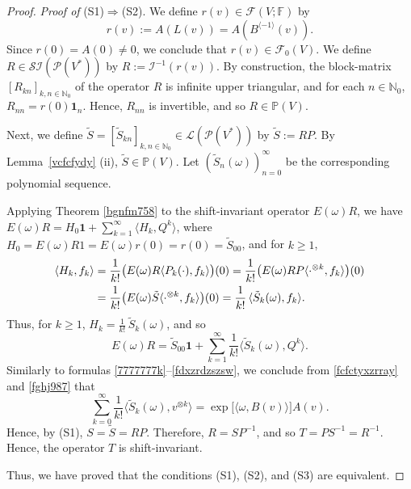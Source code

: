\documentclass[12pt]{article}
\theoremstyle{remark}
\theoremstyle{remark}
\theoremstyle{remark}
\begin{document}
\begin{proof}
{\it Proof of \/} (S1)$\Rightarrow$(S2). We define $r(v)\in \mathcal F(V;\mathbb F)$ by 
\begin{equation}\label{fcfctyxzrray}
r(v):=A(L(v))=A(B^{\langle -1\rangle}(v)).\end{equation}
  Since $r(0)=A(0)\ne0$, we conclude that $r(v)\in\mathcal F_0(V)$. We define $R\in \mathcal{SI}(\mathcal P(V^*))$ by $R:=\mathcal I^{-1}(r(v))$. By construction, the block-matrix $[R_{kn}]_{k,n\in\mathbb N_0}$ of the operator $R$ is infinite upper triangular, and for each $n\in\mathbb N_0$, $R_{nn}=r(0)\mathbf 1_n$. Hence, $R_{nn}$ is invertible, and so $R\in\mathbb P(V)$. 


Next, we define $\tilde {S}=[\tilde {S}_{kn}] _{k,n\in\mathbb N_0}\in \mathcal L (\mathcal P(V^*))$ by $\tilde{S} := RP$. By Lemma~\ref{vcfcfydy} (ii), $\tilde S\in\mathbb P(V)$.
 Let $(\tilde S_n(\omega))_{n=0}^\infty$ be the corresponding polynomial sequence. 

 Applying Theorem \ref{bgnfm758} to the shift-invariant operator $E(\omega)R$, we have 
$E(\omega)R=H_0\mathbf 1+\sum_{k=1}^\infty \langle H_k, Q^{k}\rangle$,
where $H_0=E(\omega)R1=E(\omega)r(0)=r(0)=\tilde S_{00}$, and for $k\geq 1$,
\begin{align*}
\langle H_k,f_k\rangle&=\frac1{k!}\big(E(\omega)R\langle P_k(\cdot),f_k\rangle\big)(0)=\frac1{k!}\big(E(\omega)RP\langle\cdot^{\otimes k},f_k\rangle\big)(0)\\
& =\frac1{k!}\big(E(\omega)\tilde S\langle\cdot^{\otimes k},f_k\rangle\big)(0)=\frac1{k!}\,\langle\Tilde S_k(\omega),f_k\rangle.
\end{align*}
Thus, for $k\geq 1$, $H_k=\frac 1{k!}\,\tilde S_k(\omega)$, and so 
\begin{equation}E(\omega)R=\tilde S_{00}\mathbf 1+\sum_{k=1}^\infty \frac 1{k!}\langle \tilde S_k(\omega),
Q^{k}\rangle.\label{fghj987}\end{equation} 
Similarly to formulas \eqref{7777777k}--\eqref{fdxzrdzszsw}, we conclude from \eqref{fcfctyxzrray} and \eqref{fghj987} that 
\[ \sum_{k=0}^\infty\frac1{k!}\langle \tilde S_k(\omega),v^{\otimes k}\rangle=\exp\big[\langle \omega, B(v)\rangle\big]A(v).
\]
Hence, by (S1), $S=\tilde S=RP$. Therefore, $R=SP^{-1}$, and so $T=PS^{-1}=R^{-1}$. Hence, the operator $T$ is shift-invariant. 
 
 Thus, we have proved that the conditions (S1), (S2), and (S3) are equivalent.


\end{proof}
\end{document}
